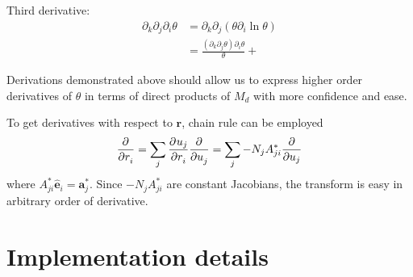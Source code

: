 \documentclass[12pt]{extarticle}
\renewcommand{\bf}{\mathbf}
\begin{document}
    Third derivative:
    \begin{align*}
        \partial_k \partial_j \partial_i \theta 
        &= \partial_k \partial_j (\theta \partial_i \ln \theta)\\
        &= \frac{(\partial_k \partial_j \theta) \partial_i \theta}{\theta} +  
    \end{align*}
    
    Derivations demonstrated above should allow us to express higher order derivatives of \(\theta\) in terms of direct products of \(M_d\) with more confidence and ease.

    To get derivatives with respect to \(\bf r\), chain rule can be employed \[
        \pdv[]{}{r_i} = \sum_j \pdv[]{u_j}{r_i} \pdv[]{}{u_j} = \sum_j - N_j A^*_{ji} \pdv{u_j}
    \]
    where \(A^*_{ji} \hat{\bf e}_i = \bf a^*_j\). Since \( - N_j A^*_{ji}\) are constant Jacobians, the transform is easy in arbitrary order of derivative.

\section{Implementation details}
\end{document}
